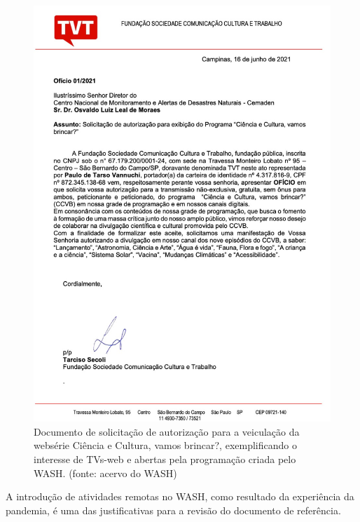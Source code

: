 \captionsetup{format=plain}
\begin{figure}[htb]

\centering


\begin{minipage}[b]{0.4\linewidth}
        \centering
                \includegraphics[width=1.0\linewidth]{../../../imagens/TVT.jpg}
                \caption{Documento de solicitação de autorização para a veiculação da websérie Ciência e Cultura, vamos brincar?, exemplificando o interesse de TVs-web e abertas pela programação criada pelo WASH. (fonte: acervo do WASH)}
                \label{51f9418c1ca6e2404e9d774513fb6c023d10b3bb}
\end{minipage}%
\hspace{0.5cm}
\end{figure}



A introdução de atividades remotas no WASH, como resultado da experiência da pandemia, é uma das justificativas para a revisão do documento de referência.

